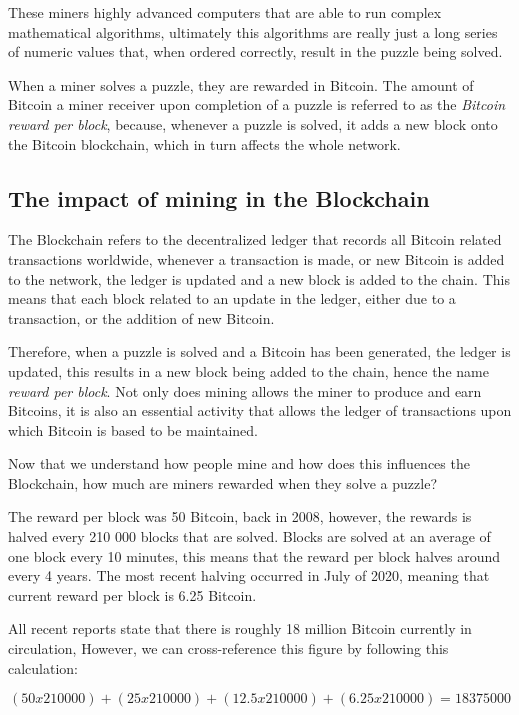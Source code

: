 \documentclass{article}
\newcommand\tab[1][1cm]{\hspace*{#1}}
\begin{document}
These miners highly advanced computers that are able to run complex mathematical algorithms, ultimately this algorithms are really just a long series of numeric values that, when ordered correctly, result in the puzzle being solved.

When a miner solves a puzzle, they are rewarded in Bitcoin. The amount of Bitcoin a miner receiver upon completion of a puzzle is referred to as the \textit{Bitcoin reward per block}, because, whenever a puzzle is solved, it adds a new block onto the Bitcoin blockchain, which in turn affects the whole network.

\subsection{The impact of mining in the Blockchain}

\tab The Blockchain refers to the decentralized ledger that records all Bitcoin related transactions worldwide, whenever a transaction is made, or new Bitcoin is added to the network, the ledger is updated and a new block is added to the chain. This means that each block related to an update in the ledger, either due to a transaction, or the addition of new Bitcoin.

Therefore, when a puzzle is solved and a Bitcoin has been generated, the ledger is updated, this results in a new block being added to the chain, hence the name \textit{reward per block}. Not only does mining allows the miner to produce and earn Bitcoins, it is also an essential activity that allows the ledger of transactions upon which Bitcoin is based to be maintained.

Now that we understand how people mine and how does this influences the Blockchain, how much are miners rewarded when they solve a puzzle?

The reward per block was 50 Bitcoin, back in 2008, however, the rewards is halved every 210 000 blocks that are solved. Blocks are solved at an average of one block every 10 minutes, this means that the reward per block halves around every 4 years. The most recent halving occurred in July of 2020, meaning that current reward per block is 6.25 Bitcoin.

All recent reports state that there is roughly 18 million Bitcoin currently in circulation, However, we can cross-reference this figure by following this calculation:

\[(50 x 210 000) + (25 x 210 000) + (12.5 x 210 000) + (6.25 x 210 000) = 18 375 000\]
\end{document}
